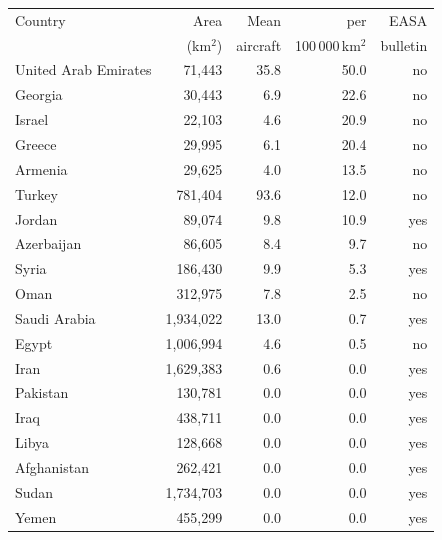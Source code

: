 \begin{tabular}{@{}lrrrr@{}}\toprule
Country & Area & Mean & per & EASA\\
 & (km$^2$) & aircraft & 100\,000\,km$^2$ & bulletin\\\midrule
United Arab Emirates & 71,443 & 35.8 & 50.0 & no\\
Georgia & 30,443 & 6.9 & 22.6 & no\\
Israel & 22,103 & 4.6 & 20.9 & no\\
Greece & 29,995 & 6.1 & 20.4 & no\\
Armenia & 29,625 & 4.0 & 13.5 & no\\
Turkey & 781,404 & 93.6 & 12.0 & no\\
Jordan & 89,074 & 9.8 & 10.9 & yes\\
Azerbaijan & 86,605 & 8.4 & 9.7 & no\\
Syria & 186,430 & 9.9 & 5.3 & yes\\
Oman & 312,975 & 7.8 & 2.5 & no\\
Saudi Arabia & 1,934,022 & 13.0 & 0.7 & yes\\
Egypt & 1,006,994 & 4.6 & 0.5 & no\\
Iran & 1,629,383 & 0.6 & 0.0 & yes\\
Pakistan & 130,781 & 0.0 & 0.0 & yes\\
Iraq & 438,711 & 0.0 & 0.0 & yes\\
Libya & 128,668 & 0.0 & 0.0 & yes\\
Afghanistan & 262,421 & 0.0 & 0.0 & yes\\
Sudan & 1,734,703 & 0.0 & 0.0 & yes\\
Yemen & 455,299 & 0.0 & 0.0 & yes\\
\bottomrule\end{tabular}